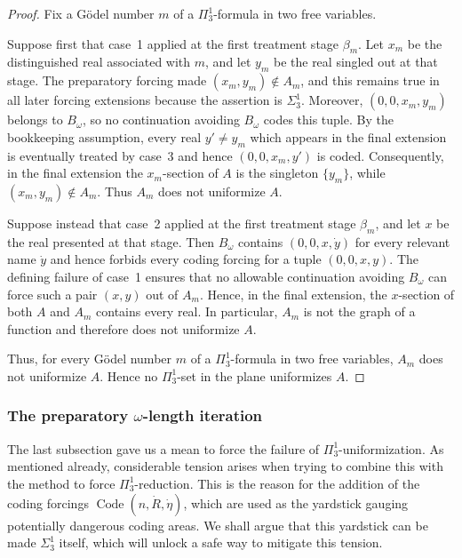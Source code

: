 \documentclass[a4paper,11pt]{article}
\begin{document}
\begin{proof}
Fix a G\"odel number $m$ of a $\Pi^1_3$-formula in two free variables.

Suppose first that case~1 applied at the first treatment stage $\beta_m$. Let $x_m$ be the distinguished real associated with $m$, and let $y_m$ be the real singled out at that stage. The preparatory forcing made $(x_m,y_m)\notin A_m$, and this remains true in all later forcing extensions because the assertion is $\Sigma^1_3$. Moreover, $(0,0,x_m,y_m)$ belongs to $B_\omega$, so no continuation avoiding $B_\omega$ codes this tuple. By the bookkeeping assumption, every real $y'\neq y_m$ which appears in the final extension is eventually treated by case~3 and hence $(0,0,x_m,y')$ is coded. Consequently, in the final extension the $x_m$-section of $A$ is the singleton $\{y_m\}$, while $(x_m,y_m)\notin A_m$. Thus $A_m$ does not uniformize $A$.

Suppose instead that case~2 applied at the first treatment stage $\beta_m$, and let $x$ be the real presented at that stage. Then $B_\omega$ contains $(0,0,x,\dot y)$ for every relevant name $\dot y$ and hence forbids every coding forcing for a tuple $(0,0,x,y)$. The defining failure of case~1 ensures that no allowable continuation avoiding $B_\omega$ can force such a pair $(x,y)$ out of $A_m$. Hence, in the final extension, the $x$-section of both $A$ and $A_m$ contains every real. In particular, $A_m$ is not the graph of a function and therefore does not uniformize $A$.

Thus, for every G\"odel number $m$ of a $\Pi^1_3$-formula in two free variables, $A_m$ does not uniformize $A$. Hence no $\Pi^1_3$-set in the plane uniformizes $A$.
\end{proof}

\subsubsection{The preparatory \texorpdfstring{$\omega$}{omega}-length iteration}\label{PreparatoryOmegaIteration}

The last subsection gave us a mean to force the failure of $\Pi^1_3$-uniformization. As mentioned already, considerable tension arises when trying to combine this with the method to force $\Pi^1_3$-reduction. This is the reason for the addition of the coding forcings $\operatorname{Code} (n,\dot{R},\dot{\eta})$, which are used as the yardstick gauging potentially dangerous coding areas. We shall argue that this yardstick can be made $\Sigma^1_3$ itself, which will unlock a safe way to mitigate this tension.
\end{document}
